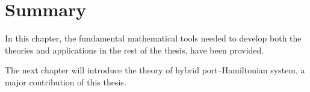 \clearpage


\section{Summary}
%
In this chapter, the fundamental mathematical tools needed to develop both the theories and applications in the rest of the thesis, have been provided. 
%
\newline

%
The next chapter will introduce the theory of hybrid port--Hamiltonian system, a major contribution of this thesis.

